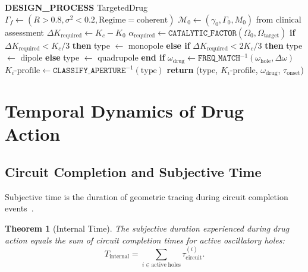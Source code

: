 \documentclass[twocolumn,10pt]{article}
\newtheorem{theorem}{Theorem}[section]
\theoremstyle{remark}
\newcommand{\Rorder}{R}
\newcommand{\Mstate}{\mathcal{M}}
\newcommand{\Gstate}{\Gamma}
\begin{document}
\begin{algorithm}
\caption{Drug Design via Poincar\'e Computing in pNPL}
\label{alg:drug_design}
\begin{algorithmic}[1]
\State \textbf{DESIGN\_PROCESS} TargetedDrug
\State
\State {}
\State $\Gstate_f \gets (\Rorder > 0.8, \sigma^2 < 0.2, \text{Regime} = \text{coherent})$
\State
\State {}
\State $\Mstate_0 \gets (\gamma_0, \Gstate_0, M_0)$ from clinical assessment
\State
\State {}
\State $\Delta K_{\mathrm{required}} \gets K_c - K_0$
\State $\alpha_{\mathrm{required}} \gets \texttt{CATALYTIC\_FACTOR}(\Omega_0, \Omega_{\mathrm{target}})$
\State
\State {}
\State \textbf{if} $\Delta K_{\mathrm{required}} < K_c / 3$ \textbf{then}
\State \quad type $\gets$ monopole 
\State \textbf{else if} $\Delta K_{\mathrm{required}} < 2K_c / 3$ \textbf{then}
\State \quad type $\gets$ dipole 
\State \textbf{else}
\State \quad type $\gets$ quadrupole 
\State \textbf{end if}
\State
\State {}
\State $\omega_{\mathrm{drug}} \gets \texttt{FREQ\_MATCH}^{-1}(\omega_{\mathrm{hole}}, \Delta\omega)$
\State $K_i\text{-profile} \gets \texttt{CLASSIFY\_APERTURE}^{-1}(\text{type})$
\State
\State \textbf{return} (type, $K_i$-profile, $\omega_{\mathrm{drug}}$, $\tau_{\mathrm{onset}}$)
\end{algorithmic}
\end{algorithm}

\section{Temporal Dynamics of Drug Action}
\label{sec:time}

\subsection{Circuit Completion and Subjective Time}

Subjective time is the duration of geometric tracing during circuit completion events~\citep{james1890principles,poppel1997temporal}.

\begin{theorem}[Internal Time]
\label{thm:time}
The subjective duration experienced during drug action equals the sum of circuit completion times for active oscillatory holes:
\begin{equation}
  T_{\mathrm{internal}} = \sum_{i \in \mathrm{active\;holes}} \tau_{\mathrm{circuit}}^{(i)}.
\end{equation}
\end{theorem}
\end{document}
